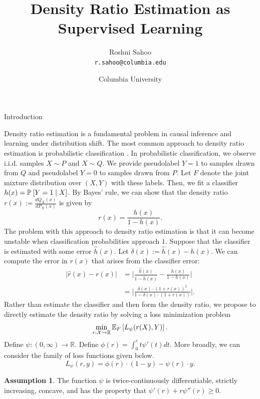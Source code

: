 \documentclass{article}
\author{Roshni Sahoo\\
  \texttt{r.sahoo@columbia.edu}}
\title{Density Ratio Estimation as Supervised Learning}
\date{Columbia University}
\theoremstyle{definition}
\newtheorem{assumption}{Assumption}
\theoremstyle{plain}
\theoremstyle{remark}
\begin{document}
\maketitle


\begin{section}{Introduction}

Density ratio estimation is a fundamental problem in causal inference and learning under distribution shift. The most common approach to density ratio estimation is probabilistic classification \citep{menon2016linking,sugiyama2008direct}. In probabilistic classification, we observe i.i.d. samples $X \sim P$ and $X \sim Q$. We provide pseudolabel $Y=1$ to samples drawn from $Q$ and pseudolabel $Y=0$ to samples drawn from $P$. Let $F$ denote the joint mixture distribution over $(X, Y)$ with these labels. Then, we fit a classifier $h(x) = \PP[]{Y=1 \mid X}$. By Bayes' rule, we can show that the density ratio $r(x) := \frac{dQ_{X}(x)}{dP_{X}(x)}$ is given by
\[ r(x) = \frac{h(x)}{1 - h(x)}.\]
The problem with this approach to density ratio estimation is that it can become unstable when classification probabilities approach $1$. Suppose that the classifier is estimated with some error $\hat{h}(x)$. Let $\delta(x) := \hat{h}(x) - h(x)$. We can compute the error in $r(x)$ that arises from the classifier error:
\begin{align*} 
|\hat{r}(x) - r(x)| &=  \Bigg| \frac{\hat{h}(x)}{1 - \hat{h}(x)} - \frac{h(x)}{1 - h(x)} \Bigg| \\
&= \Bigg| \frac{\delta(x) \cdot (1 + r(x))^{2}}{ 1 - \delta(x) \cdot ( 1 + r(x) ) } \Bigg|.
\end{align*}
Rather than estimate the classifier and then form the density ratio, we propose to directly estimate the density ratio by solving a loss minimization problem
\begin{equation}
\label{eq:direct_dre}
\min_{r: \mathcal{X} \rightarrow \mathbb{R}} \EE[F]{L_{\psi}(r(X), Y)}.
\end{equation}
Define $\psi:(0, \infty) \rightarrow\mathbb{R}$. Define $\phi(r) = \int_{0}^{r} t\psi'(t)dt.$ More broadly, we can consider the family of loss functions given below.
\begin{equation} 
\label{eq:loss}
L_{\psi}(r, y) = \phi(r) \cdot (1 - y) - \psi(r) \cdot y. \end{equation}

\begin{assumption}
\label{assumption:psi}
The function $\psi$ is twice-continuously differentiable, strictly increasing, concave, and has the property that $\psi'(r) + r\psi''(r) \geq 0.$
\end{assumption}


\end{section}
\end{document}

